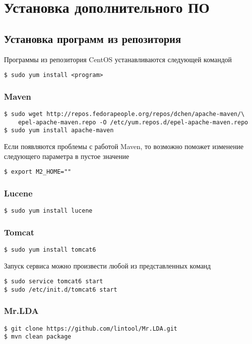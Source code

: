 \chapter{Установка дополнительного ПО}
\section{Установка программ из репозитория}
Программы из репозитория CentOS устанавливаются следующей командой
\begin{lstlisting}
$ sudo yum install <program>
\end{lstlisting}

\subsection{Maven}
\begin{lstlisting}
$ sudo wget http://repos.fedorapeople.org/repos/dchen/apache-maven/\
    epel-apache-maven.repo -O /etc/yum.repos.d/epel-apache-maven.repo
$ sudo yum install apache-maven
\end{lstlisting}
Если появляются проблемы с работой Maven, то возможно поможет изменение следующего параметра 
в пустое значение
\begin{lstlisting}
$ export M2_HOME=""
\end{lstlisting} 

\subsection{Lucene}
\begin{lstlisting}
$ sudo yum install lucene
\end{lstlisting}

\subsection{Tomcat}
\begin{lstlisting}
$ sudo yum install tomcat6
\end{lstlisting}
Запуск сервиса можно произвести любой из представленных команд
\begin{lstlisting}
$ sudo service tomcat6 start
$ sudo /etc/init.d/tomcat6 start
\end{lstlisting}

\subsection{Mr.LDA}
\begin{lstlisting}
$ git clone https://github.com/lintool/Mr.LDA.git
$ mvn clean package
\end{lstlisting}

